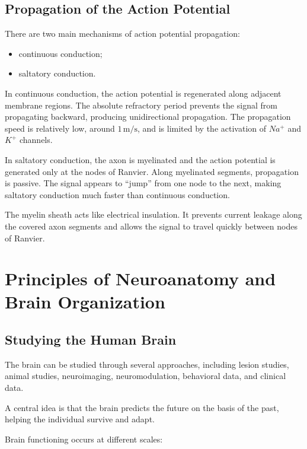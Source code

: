 \subsection{Propagation of the Action Potential}

There are two main mechanisms of action potential propagation:

\begin{itemize}[noitemsep]
    \item continuous conduction;
    \item saltatory conduction.
\end{itemize}

In continuous conduction, the action potential is regenerated along adjacent membrane regions. The absolute refractory period prevents the signal from propagating backward, producing unidirectional propagation. The propagation speed is relatively low, around $1\,\text{m/s}$, and is limited by the activation of $Na^+$ and $K^+$ channels.

In saltatory conduction, the axon is myelinated and the action potential is generated only at the nodes of Ranvier. Along myelinated segments, propagation is passive. The signal appears to ``jump'' from one node to the next, making saltatory conduction much faster than continuous conduction.

\begin{authornote}
The myelin sheath acts like electrical insulation. It prevents current leakage along the covered axon segments and allows the signal to travel quickly between nodes of Ranvier.
\end{authornote}

\section{Principles of Neuroanatomy and Brain Organization}

\subsection{Studying the Human Brain}

The brain can be studied through several approaches, including lesion studies, animal studies, neuroimaging, neuromodulation, behavioral data, and clinical data.

A central idea is that the brain predicts the future on the basis of the past, helping the individual survive and adapt.

Brain functioning occurs at different scales:

